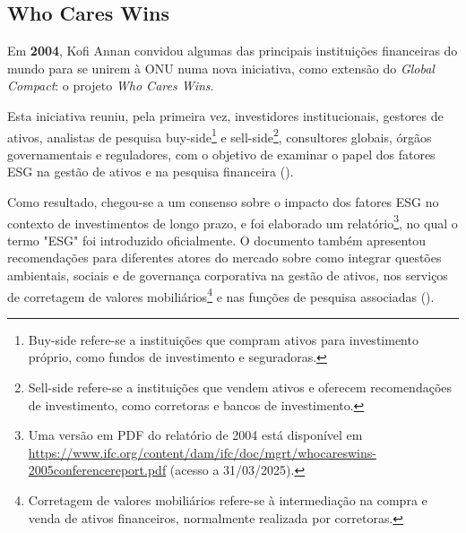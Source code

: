 \subsection{Who Cares Wins}
\label{subsec: WCW}

Em \textbf{2004}, Kofi Annan convidou algumas das principais instituições financeiras do mundo para se unirem à \gls{ONU} numa nova iniciativa, como extensão do \textit{Global Compact}: o projeto \textit{Who Cares Wins}.

Esta iniciativa reuniu, pela primeira vez, investidores institucionais, gestores de ativos, analistas de pesquisa buy-side\footnote{Buy-side refere-se a instituições que compram ativos para investimento próprio, como fundos de investimento e seguradoras.} e sell-side\footnote{Sell-side refere-se a instituições que vendem ativos e oferecem recomendações de investimento, como corretoras e bancos de investimento.}, consultores globais, órgãos governamentais e reguladores, com o objetivo de examinar o papel dos fatores \gls{ESG} na gestão de ativos e na pesquisa financeira (\cite{Pollman2024}).

Como resultado, chegou-se a um consenso sobre o impacto dos fatores ESG no contexto de investimentos de longo prazo, e foi elaborado um relatório\footnote{Uma versão em PDF do relatório de 2004 está disponível em \url{https://www.ifc.org/content/dam/ifc/doc/mgrt/whocareswins-2005conferencereport.pdf} (acesso a 31/03/2025).}, no qual o termo "ESG" foi introduzido oficialmente. O documento também apresentou recomendações para diferentes atores do mercado sobre como integrar questões ambientais, sociais e de governança corporativa na gestão de ativos, nos serviços de corretagem de valores mobiliários\footnote{Corretagem de valores mobiliários refere-se à intermediação na compra e venda de ativos financeiros, normalmente realizada por corretoras.} e nas funções de pesquisa associadas (\cite{onValues2005}).

